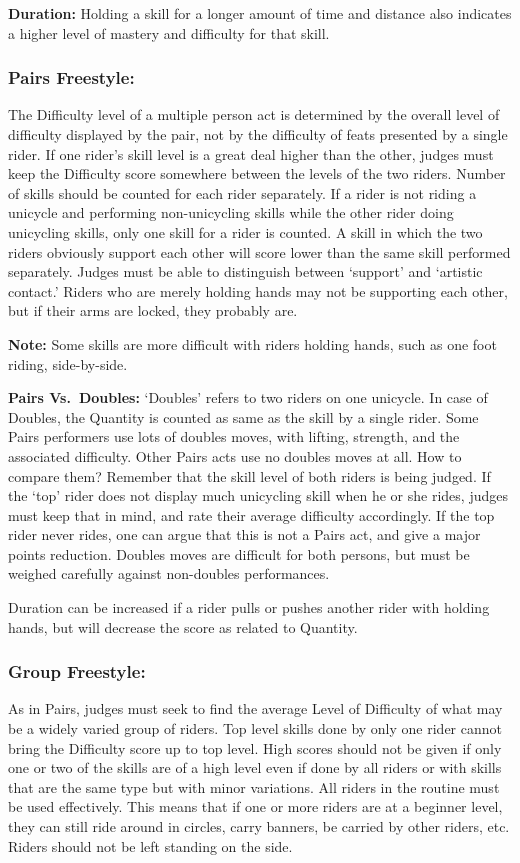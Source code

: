 \textbf{Duration:} Holding a skill for a longer amount of time and distance also indicates a higher level of mastery and difficulty for that skill.

\subsubsection{Pairs Freestyle:}
The Difficulty level of a multiple person act is determined by the overall level of difficulty displayed by the pair, not by the difficulty of feats presented by a single rider.
If one rider's skill level is a great deal higher than the other, judges must keep the Difficulty score somewhere between the levels of the two riders.
Number of skills should be counted for each rider separately.
If a rider is not riding a unicycle and performing non-unicycling skills while the other rider doing unicycling skills, only one skill for a rider is counted.
A skill in which the two riders obviously support each other will score lower than the same skill performed separately.
Judges must be able to distinguish between `support' and `artistic contact.' Riders who are merely holding hands may not be supporting each other, but if their arms are locked, they probably are.

\textbf{Note:} Some skills are more difficult with riders holding hands, such as one foot riding, side-by-side.

\textbf{Pairs Vs.\ Doubles:} `Doubles' refers to two riders on one unicycle.
In case of Doubles, the Quantity is counted as same as the skill by a single rider.
Some Pairs performers use lots of doubles moves, with lifting, strength, and the associated difficulty.
Other Pairs acts use no doubles moves at all.
How to compare them?
Remember that the skill level of both riders is being judged.
If the `top' rider does not display much unicycling skill when he or she rides, judges must keep that in mind, and rate their average difficulty accordingly.
If the top rider never rides, one can argue that this is not a Pairs act, and give a major points reduction.
Doubles moves are difficult for both persons, but must be weighed carefully against non-doubles performances.

Duration can be increased if a rider pulls or pushes another rider with holding hands, but will decrease the score as related to Quantity.

\subsubsection{Group Freestyle:}
As in Pairs, judges must seek to find the average Level of Difficulty of what may be a widely varied group of riders.
Top level skills done by only one rider cannot bring the Difficulty score up to top level.
High scores should not be given if only one or two of the skills are of a high level even if done by all riders or with skills that are the same type but with minor variations.
All riders in the routine must be used effectively.
This means that if one or more riders are at a beginner level, they can still ride around in circles, carry banners, be carried by other riders, etc.
Riders should not be left standing on the side.

